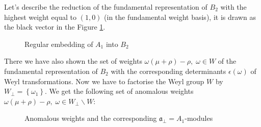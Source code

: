 \documentclass[a4paper,12pt]{article}
\theoremstyle{definition} \newtheorem{Def}{Definition}
\begin{document}
Let's describe the reduction of the fundamental representation of $B_2$ with the highest weight equal to $(1,0)$ (in the fundamental weight basis), it is drawn as the black vector in the Figure \ref{fig:B2_A1}.
\begin{figure}[ph]
  \noindent{}
  \caption{Regular embedding of $A_1$ into $B_2$}
  \label{fig:B2_A1}
\end{figure}
There we have also shown the set of weights $\omega(\mu+\rho)-\rho,\; \omega\in W$ of the fundamental representation of $B_2$ with the corresponding determinants $\epsilon(\omega)$ of Weyl transformations.
Now we have to factorise the Weyl group $W$ by $W_{\bot}=\left\{\omega_1\right\}$. We get the following set of anomalous weights $\omega(\mu+\rho)-\rho,\; \omega\in W_{\bot}\backslash W$:
\begin{figure}[ph]
  \noindent{}
  \caption{Anomalous weights and the corresponding $\mathfrak{a}_{\bot}=A_1$-modules}
  \label{fig:B2_A1_2}
\end{figure}
\end{document}
